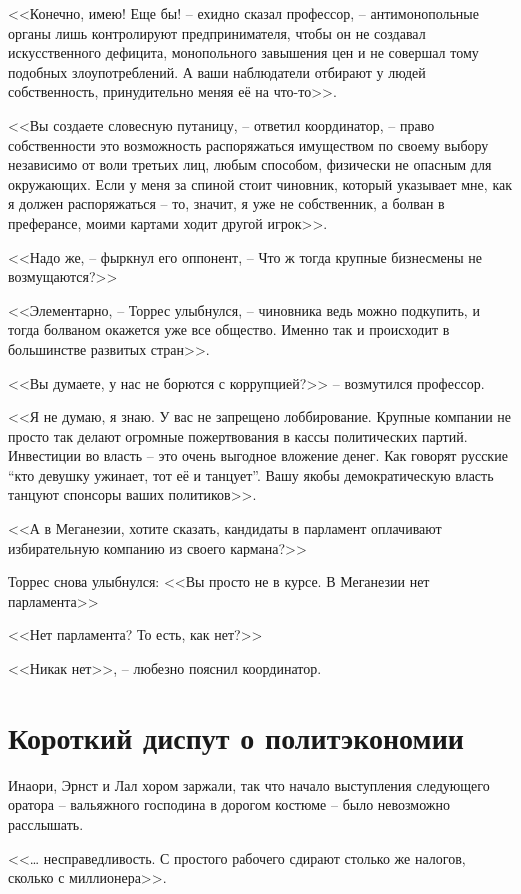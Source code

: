 <<Конечно, имею! Еще бы! -- ехидно сказал профессор, -- антимонопольные органы лишь контролируют предпринимателя, чтобы он не создавал искусственного дефицита, монопольного завышения цен и не совершал тому подобных злоупотреблений. А ваши наблюдатели отбирают у людей собственность, принудительно меняя её на что-то>>.

<<Вы создаете словесную путаницу, -- ответил координатор, -- право собственности это возможность распоряжаться имуществом по своему выбору независимо от воли третьих лиц, любым способом, физически не опасным для окружающих. Если у меня за спиной стоит чиновник, который указывает мне, как я должен распоряжаться -- то, значит, я уже не собственник, а болван в преферансе, моими картами ходит другой игрок>>.

<<Надо же, -- фыркнул его оппонент, -- Что ж тогда крупные бизнесмены не возмущаются?>>

<<Элементарно, -- Торрес улыбнулся, -- чиновника ведь можно подкупить, и тогда болваном окажется уже все общество. Именно так и происходит в большинстве развитых стран>>.

<<Вы думаете, у нас не борются с коррупцией?>> -- возмутился профессор.

<<Я не думаю, я знаю. У вас не запрещено лоббирование. Крупные компании не просто так делают огромные пожертвования в кассы политических партий. Инвестиции во власть -- это очень выгодное вложение денег. Как говорят русские ``кто девушку ужинает, тот её и танцует''. Вашу якобы демократическую власть танцуют спонсоры ваших политиков>>.

<<А в Меганезии, хотите сказать, кандидаты в парламент оплачивают избирательную компанию из своего кармана?>>

Торрес снова улыбнулся: <<Вы просто не в курсе. В Меганезии нет парламента>>

<<Нет парламента? То есть, как нет?>>

<<Никак нет>>, -- любезно пояснил координатор.


\chapter{Короткий диспут о политэкономии}


Инаори, Эрнст и Лал хором заржали, так что начало выступления следующего оратора -- вальяжного господина в дорогом костюме -- было невозможно расслышать.

<<\ldots{} несправедливость. С простого рабочего сдирают столько же налогов, сколько с миллионера>>.

